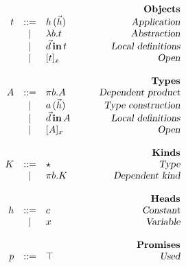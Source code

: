 \begin{figure}

\begin{center}
\begin{math}
\begin{array}{rclr}
&&&\qquad\textsl{\bf Objects}\\
t 

&::=& 
h\,(\vec{h}) 
& \qquad\textsl{Application}
\\

&|&
\lambda b. t
& \qquad\textsl{Abstraction}
\\

&|&
\vec{d} \,\textbf{in}\, t
& \qquad\textsl{Local definitions}
\\

&|&
[ t ]_{x}
& \qquad\textsl{Open}
\\
\\
&&&\qquad\textsl{\bf Types}\\
A

&::=& 
\pi b. A
& \qquad\textsl{Dependent product}
\\

&|& 
a\,(\vec{h})
& \qquad\textsl{Type construction}
\\

&|& 
\vec{d} \,\textbf{in}\, A
& \qquad\textsl{Local definitions}
\\


&|& 
[ A ]_{x}
& \qquad\textsl{Open}
\\
\\
&&&\qquad\textsl{\bf Kinds}\\
K

&::=&
\star
& \qquad\textsl{Type}
\\

&|&
\pi b. K
& \qquad\textsl{Dependent kind}
\\
\\

&&&\qquad\textsl{\bf Heads}\\
h

&::=& 
c
& \qquad\textsl{Constant}
\\
&|& 
x
& \qquad\textsl{Variable}
\\
\\
&&&\qquad\textsl{\bf Promises}\\
p 

&::=&
\top
& \qquad\textsl{Used}
\\


\end{array}
\end{math}
\end{center}
\end{figure}

